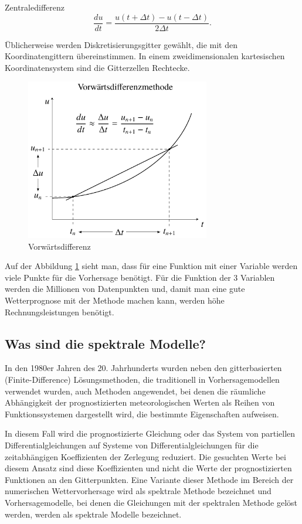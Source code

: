 Zentraledifferenz
\begin{equation}
\frac{du}{dt} = \frac{u(t + \Delta{t}) - u(t - \Delta{t})}{2\Delta{t}}.
\label{spektral:equation3}
\end{equation}

Üblicherweise werden Diskretisierungsgitter gewählt, die mit den Koordinatengittern übereinstimmen.
In einem zweidimensionalen kartesischen Koordinatensystem sind die Gitterzellen Rechtecke.
\pagebreak
\begin{figure}
	\centering
	\includegraphics[height=200pt]{papers/spektral/images/forward_difference.pdf}
	\caption{Vorwärtsdifferenz}
    \label{spektral:fig:gittermodelle}
\end{figure}

Auf der Abbildung \ref{spektral:fig:gittermodelle} sieht man, dass für eine Funktion mit einer Variable werden viele Punkte für die Vorhersage benötigt. Für die Funktion der 3 Variablen werden die Millionen von Datenpunkten und, damit man eine gute Wetterprognose mit der Methode machen kann, werden höhe Rechnungsleistungen benötigt.

\subsection{Was sind die spektrale Modelle?
\label{spektral:subsection:spektralemodelle}}
In den 1980er Jahren des 20. Jahrhunderts wurden neben den gitterbasierten (Finite-Difference) Lösungsmethoden, die traditionell in Vorhersagemodellen verwendet wurden, auch Methoden angewendet, bei denen die räumliche Abhängigkeit der prognostizierten meteorologischen Werten als Reihen von Funktionssystemen dargestellt wird, die bestimmte Eigenschaften aufweisen.

In diesem Fall wird die prognostizierte Gleichung oder das System von partiellen Differentialgleichungen auf Systeme von Differentialgleichungen für die zeitabhängigen Koeffizienten der Zerlegung reduziert.
Die gesuchten Werte bei diesem Ansatz sind diese Koeffizienten und nicht die Werte der prognostizierten Funktionen an den Gitterpunkten. 
Eine Variante dieser Methode im Bereich der numerischen Wettervorhersage wird als spektrale Methode bezeichnet und Vorhersagemodelle, bei denen die Gleichungen mit der spektralen Methode gelöst werden, werden als spektrale Modelle bezeichnet.

